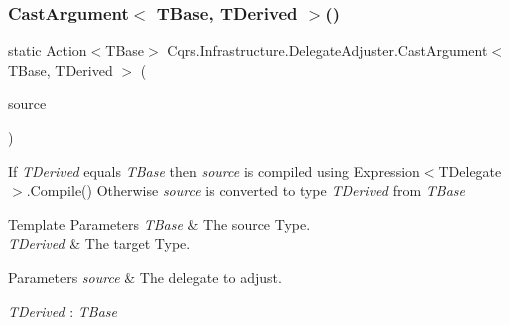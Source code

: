 \subsubsection{\texorpdfstring{Cast\+Argument$<$ T\+Base, T\+Derived $>$()}{CastArgument< TBase, TDerived >()}}
{\footnotesize\ttfamily static Action$<$T\+Base$>$ Cqrs.\+Infrastructure.\+Delegate\+Adjuster.\+Cast\+Argument$<$ T\+Base, T\+Derived $>$ (\begin{DoxyParamCaption}\item[{Expression$<$ Action$<$ T\+Derived $>$$>$}]{source }\end{DoxyParamCaption})\hspace{0.3cm}{\ttfamily [static]}}



If {\itshape T\+Derived}  equals {\itshape T\+Base}  then {\itshape source}  is compiled using Expression$<$\+T\+Delegate$>$.\+Compile() Otherwise {\itshape source}  is converted to type {\itshape T\+Derived}  from {\itshape T\+Base}  


\begin{DoxyTemplParams}{Template Parameters}
{\em T\+Base} & The source Type.\\
\hline
{\em T\+Derived} & The target Type.\\
\hline
\end{DoxyTemplParams}

\begin{DoxyParams}{Parameters}
{\em source} & The delegate to adjust.\\
\hline
\end{DoxyParams}
\begin{Desc}
\item[Type Constraints]\begin{description}
\item[{\em T\+Derived} : {\em T\+Base}]\end{description}
\end{Desc}
